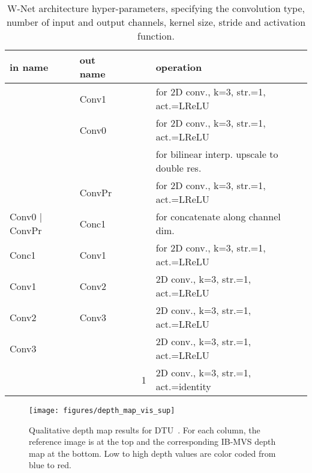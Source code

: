 \documentclass{bmvc2k}
\begin{document}
\FloatBarrier

 \begin{table}[t] 
  \centering
  \small
  \setlength{\tabcolsep}{2pt}
  \begin{tabular}{@{}llccl@{}}
      \toprule
      in name & out name &  &  & operation \\ \midrule
       & Conv1 &  &  & for  2D conv., k=3, str.=1, act.=LReLU \\
       & Conv0 &  &  & for  2D conv., k=3, str.=1, act.=LReLU \\
       &  &  &  & for  bilinear interp. upscale to double res. \\
       & ConvPr &  &  & for  2D conv., k=3, str.=1, act.=LReLU \\
      Conv0 | ConvPr & Conc1 &  &  & for  concatenate along channel dim. \\
      Conc1 & Conv1 &  &  & for  2D conv., k=3, str.=1, act.=LReLU \\
      Conv1 & Conv2 &  &  & 2D conv., k=3, str.=1, act.=LReLU \\
      Conv2 & Conv3 &  &  & 2D conv., k=3, str.=1, act.=LReLU \\
      Conv3 &  &  &  & 2D conv., k=3, str.=1, act.=LReLU \\
       &  &  & 1 & 2D conv., k=3, str.=1, act.=identity \\
      \bottomrule
      \end{tabular}
  \caption{W-Net architecture hyper-parameters, specifying the convolution type, number of input and output channels, kernel size, stride and activation function.}
  \label{tab_network_arch_wnet}
  \end{table}


\begin{figure}[t]
\centering
\texttt{[image: figures/depth\_map\_vis\_sup]}
\caption{Qualitative depth map results for DTU~\cite{dtu}. For each column, the reference image is at the top and the corresponding IB-MVS depth map at the bottom. Low to high depth values are color coded from blue to red.}
\label{fig_sup_depth_map_vis}
\end{figure}

\FloatBarrier


\end{document}
